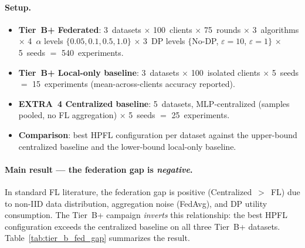 \documentclass[conference]{IEEEtran}
\begin{document}
\paragraph{Setup.}
\begin{itemize}
\item \textbf{Tier~B+ Federated}: 3~datasets $\times$ 100~clients $\times$ 75~rounds $\times$ 3~algorithms $\times$ 4~$\alpha$ levels $\{0.05, 0.1, 0.5, 1.0\}$ $\times$ 3~DP levels $\{$No-DP, $\varepsilon{=}10$, $\varepsilon{=}1\}$ $\times$ 5~seeds $=$ 540~experiments.
\item \textbf{Tier~B+ Local-only baseline}: 3~datasets $\times$ 100~isolated clients $\times$ 5~seeds $=$ 15~experiments (mean-across-clients accuracy reported).
\item \textbf{EXTRA~4 Centralized baseline}: 5~datasets, MLP-centralized (samples pooled, no FL aggregation) $\times$ 5~seeds $=$ 25~experiments.
\item \textbf{Comparison}: best HPFL configuration per dataset against the upper-bound centralized baseline and the lower-bound local-only baseline.
\end{itemize}

\paragraph{Main result --- the federation gap is \emph{negative}.} In standard FL literature, the federation gap is positive (Centralized~$>$~FL) due to non-IID data distribution, aggregation noise (FedAvg), and DP utility consumption. The Tier~B+ campaign \emph{inverts} this relationship: the best HPFL configuration exceeds the centralized baseline on all three Tier~B+ datasets. Table~\ref{tab:tier_b_fed_gap} summarizes the result.
\end{document}
